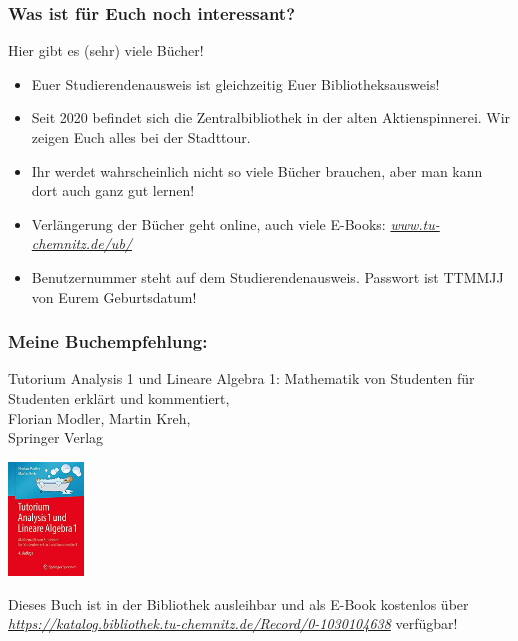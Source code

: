 \documentclass[10pt]{beamer}
\makeatletter
\newcommand{\highl}[1]{\color{tuccolor@ma}#1\color{black}}
\makeatother
\begin{document}
\begin{frame}
	\frametitle{Was ist für Euch noch interessant?}

	\begin{block}{\vphantom{X}}
		Hier gibt es (sehr) viele Bücher!
	\end{block}

	\begin{itemize}
		\item Euer Studierendenausweis ist gleichzeitig Euer Bibliotheksausweis!
		\item Seit 2020 befindet sich die Zentralbibliothek in der alten Aktienspinnerei. Wir zeigen Euch alles bei der Stadttour.
		\item Ihr werdet wahrscheinlich nicht so viele Bücher brauchen, aber man kann dort auch ganz gut lernen!
		\item Verlängerung der Bücher geht online, auch viele E-Books: \highl{\textit{\href{https://www.tu-chemnitz.de/ub/}{www.tu-chemnitz.de/ub/}}}
		\item Benutzernummer steht auf dem Studierendenausweis. Passwort ist TTMMJJ von Eurem Geburtsdatum!
	\end{itemize}
\end{frame}

\begin{frame}
	\frametitle{Meine Buchempfehlung:}

	Tutorium Analysis 1 und Lineare Algebra 1: Mathematik von Studenten für Studenten erklärt und kommentiert, \\
	Florian Modler, Martin Kreh, \\
	Springer Verlag 

	\begin{center}
		\includegraphics[width=2cm]{bilder/Buch.jpg}
	\end{center}

	Dieses Buch ist in der Bibliothek ausleihbar und als E-Book kostenlos über \highl{\textit{\href{https://katalog.bibliothek.tu-chemnitz.de/Record/0-1030104638}{https://katalog.bibliothek.tu-chemnitz.de/Record/0-1030104638}}} verfügbar!
\end{frame}
\end{document}

